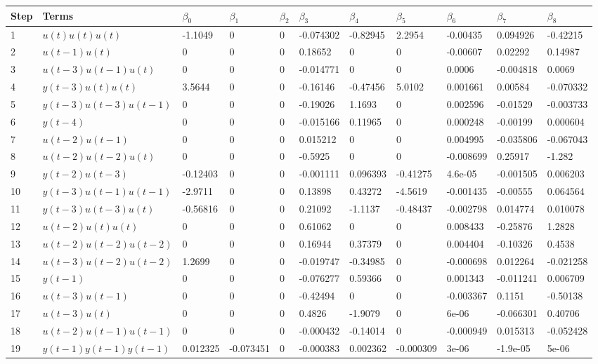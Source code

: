 \begin{tabular}{lllllllllll}
Step & Terms & $\beta_{0}$ & $\beta_{1}$ & $\beta_{2}$ & $\beta_{3}$ & $\beta_{4}$ & $\beta_{5}$ & $\beta_{6}$ & $\beta_{7}$ & $\beta_{8}$ \\ 
\hline 
1 & $u(t)u(t)u(t)$ & -1.1049 & 0 & 0 & -0.074302 & -0.82945 & 2.2954 & -0.00435 & 0.094926 & -0.42215 \\ 
2 & $u(t-1)u(t)$ & 0 & 0 & 0 & 0.18652 & 0 & 0 & -0.00607 & 0.02292 & 0.14987 \\ 
3 & $u(t-3)u(t-1)u(t)$ & 0 & 0 & 0 & -0.014771 & 0 & 0 & 0.0006 & -0.004818 & 0.0069 \\ 
4 & $y(t-3)u(t)u(t)$ & 3.5644 & 0 & 0 & -0.16146 & -0.47456 & 5.0102 & 0.001661 & 0.00584 & -0.070332 \\ 
5 & $y(t-3)u(t-3)u(t-1)$ & 0 & 0 & 0 & -0.19026 & 1.1693 & 0 & 0.002596 & -0.01529 & -0.003733 \\ 
6 & $y(t-4)$ & 0 & 0 & 0 & -0.015166 & 0.11965 & 0 & 0.000248 & -0.00199 & 0.000604 \\ 
7 & $u(t-2)u(t-1)$ & 0 & 0 & 0 & 0.015212 & 0 & 0 & 0.004995 & -0.035806 & -0.067043 \\ 
8 & $u(t-2)u(t-2)u(t)$ & 0 & 0 & 0 & -0.5925 & 0 & 0 & -0.008699 & 0.25917 & -1.282 \\ 
9 & $y(t-2)u(t-3)$ & -0.12403 & 0 & 0 & -0.001111 & 0.096393 & -0.41275 & 4.6e-05 & -0.001505 & 0.006203 \\ 
10 & $y(t-3)u(t-1)u(t-1)$ & -2.9711 & 0 & 0 & 0.13898 & 0.43272 & -4.5619 & -0.001435 & -0.00555 & 0.064564 \\ 
11 & $y(t-3)u(t-3)u(t)$ & -0.56816 & 0 & 0 & 0.21092 & -1.1137 & -0.48437 & -0.002798 & 0.014774 & 0.010078 \\ 
12 & $u(t-2)u(t)u(t)$ & 0 & 0 & 0 & 0.61062 & 0 & 0 & 0.008433 & -0.25876 & 1.2828 \\ 
13 & $u(t-2)u(t-2)u(t-2)$ & 0 & 0 & 0 & 0.16944 & 0.37379 & 0 & 0.004404 & -0.10326 & 0.4538 \\ 
14 & $u(t-3)u(t-2)u(t-2)$ & 1.2699 & 0 & 0 & -0.019747 & -0.34985 & 0 & -0.000698 & 0.012264 & -0.021258 \\ 
15 & $y(t-1)$ & 0 & 0 & 0 & -0.076277 & 0.59366 & 0 & 0.001343 & -0.011241 & 0.006709 \\ 
16 & $u(t-3)u(t-1)$ & 0 & 0 & 0 & -0.42494 & 0 & 0 & -0.003367 & 0.1151 & -0.50138 \\ 
17 & $u(t-3)u(t)$ & 0 & 0 & 0 & 0.4826 & -1.9079 & 0 & 6e-06 & -0.066301 & 0.40706 \\ 
18 & $u(t-2)u(t-1)u(t-1)$ & 0 & 0 & 0 & -0.000432 & -0.14014 & 0 & -0.000949 & 0.015313 & -0.052428 \\ 
19 & $y(t-1)y(t-1)y(t-1)$ & 0.012325 & -0.073451 & 0 & -0.000383 & 0.002362 & -0.000309 & 3e-06 & -1.9e-05 & 5e-06 \\ 
\hline 
\end{tabular}